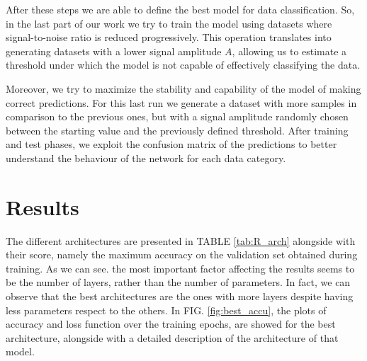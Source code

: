 \documentclass[prl,twocolumn]{revtex4-1}
\newcommand{\figref}[1]{FIG. \ref{#1}}
\newcommand{\tabref}[1]{TABLE \ref{#1}}
\begin{document}


After these steps we are able to define the best model for data classification. So, in the last part of our work we try to train the model using datasets where signal-to-noise ratio is reduced progressively. This operation translates into generating datasets with a lower signal amplitude $A$, allowing us to estimate a threshold under which the model is not capable of effectively classifying the data.

Moreover, we try to maximize the stability and capability of the model of making correct predictions. For this last run we generate a dataset with more samples in comparison to the previous ones, but with a signal amplitude randomly chosen between the starting value and the previously defined threshold. After training and test phases, we exploit the confusion matrix of the predictions to better understand the behaviour of the network for each data category.





 

\section{Results}
The different architectures are presented in \tabref{tab:R_arch} alongside with their score, namely the maximum accuracy on the validation set obtained during training. As we can see. the most important factor affecting the results seems to be the number of layers, rather than the number of parameters. In fact, we can observe that the best architectures are the ones with more layers despite having less parameters respect to the others. In  \figref{fig:best_accu}, the plots of accuracy and loss function over the training epochs, are showed for the best architecture, alongside with a detailed description of the architecture of that model. 
\end{document}
